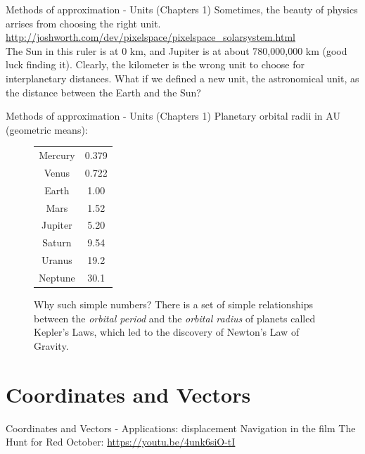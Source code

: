 \documentclass{beamer}
\begin{document}
\begin{frame}{Methods of approximation - Units (Chapters 1)}
\centering
Sometimes, the beauty of physics arrises from choosing the right unit. \\
\vspace{1cm}
\small
\url{http://joshworth.com/dev/pixelspace/pixelspace\_solarsystem.html} \\
\vspace{1cm}
\normalsize
The Sun in this ruler is at 0 km, and Jupiter is at about 780,000,000 km (good luck finding it).  Clearly, the kilometer is the wrong unit to choose for interplanetary distances.  What if we defined a new unit, the \alert{astronomical unit}, as the distance between the Earth and the Sun?
\end{frame}

\begin{frame}{Methods of approximation - Units (Chapters 1)}
Planetary orbital radii in \alert{AU} (geometric means):
\begin{figure}
\begin{tabular}{| c | c |}
\hline
Mercury & 0.379 \\
Venus & 0.722 \\
Earth & 1.00 \\
Mars & 1.52 \\
Jupiter & 5.20 \\
Saturn & 9.54 \\
Uranus & 19.2 \\
Neptune & 30.1 \\
\hline
\end{tabular}
\caption{\label{tab:planets} Why such simple numbers?  There is a set of simple relationships between the \textit{orbital period} and the \textit{orbital radius} of planets called Kepler's Laws, which led to the discovery of \alert{Newton's Law of Gravity.}}
\end{figure}
\end{frame}

\section{Coordinates and Vectors}

\begin{frame}{Coordinates and Vectors - Applications: displacement}
Navigation in the film The Hunt for Red October:
\url{https://youtu.be/4unk6siO-tI}
\end{frame}
\end{document}
